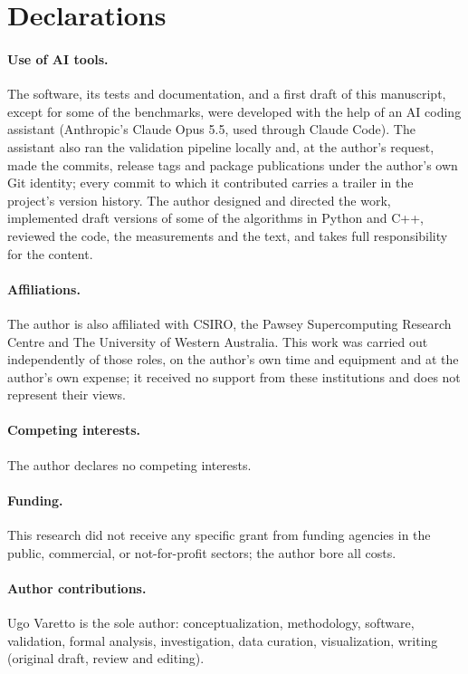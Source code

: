 \section*{Declarations}

\paragraph{Use of AI tools.}
The software, its tests and documentation, and a first draft of this manuscript,
except for some of the benchmarks, were developed with the help of an AI coding assistant 
(Anthropic's Claude Opus 5.5, used through Claude Code).
The assistant also ran the validation pipeline locally and, at the author's
request, made the commits, release tags and package publications under the
author's own Git identity; every commit to which it contributed carries a
 trailer in the project's version history.
The author designed and directed the work, implemented draft versions of some
of the algorithms in Python and C++, reviewed the code, the measurements and 
the text, and takes full responsibility for the content.

\paragraph{Affiliations.}
The author is also affiliated with CSIRO, the Pawsey Supercomputing Research
Centre and The University of Western Australia. This work was carried out
independently of those roles, on the author's own time and equipment and at
the author's own expense; it received no support from these institutions and
does not represent their views.

\paragraph{Competing interests.}
The author declares no competing interests.

\paragraph{Funding.}
This research did not receive any specific grant from funding agencies in
the public, commercial, or not-for-profit sectors; the author bore all costs.

\paragraph{Author contributions.}
Ugo Varetto is the sole author: conceptualization, methodology, software,
validation, formal analysis, investigation, data curation, visualization,
writing (original draft, review and editing).

